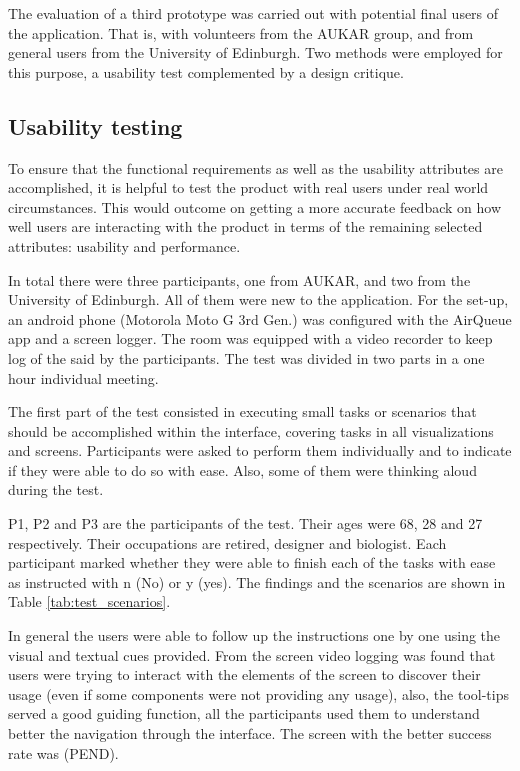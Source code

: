 The evaluation of a third prototype was carried out with potential final users of the application. That is, with volunteers from the AUKAR group, and from general users from the University of Edinburgh. Two methods were employed for this purpose, a usability test complemented by a design critique. 

\subsection{Usability testing}
To ensure that the functional requirements as well as the usability attributes are accomplished, it is helpful to test the product with real users under real world circumstances. This would outcome on getting a more accurate feedback on how well users are interacting with the product in terms of the remaining selected attributes: usability and performance.

In total there were three participants, one from AUKAR, and two from the University of Edinburgh. All of them were new to the application. For the set-up, an android phone (Motorola Moto G 3rd Gen.) was configured with the AirQueue app and a screen logger. The room was equipped with a video recorder to keep log of the said by the participants. The test was divided in two parts in a one hour individual meeting. 

The first part of the test consisted in executing small tasks or scenarios that should be accomplished within the interface, covering tasks in all visualizations and screens. Participants were asked to perform them individually and to indicate if they were able to do so with ease. Also, some of them were thinking aloud during the test. 

P1, P2 and P3 are the participants of the test. Their ages were 68, 28 and 27 respectively. Their occupations are retired, designer and biologist. Each participant marked whether they were able to finish each of the tasks with ease as instructed with n (No) or y (yes). The findings and the scenarios are shown in Table \ref{tab:test_scenarios}.

In general the users were able to follow up the instructions one by one using the visual and textual cues provided. From the screen video logging was found that users were trying to interact with the elements of the screen to discover their usage (even if some components were not providing any usage), also, the tool-tips served a good guiding function, all the participants used them to understand better the navigation through the interface. The screen with the better success rate was (PEND). 

